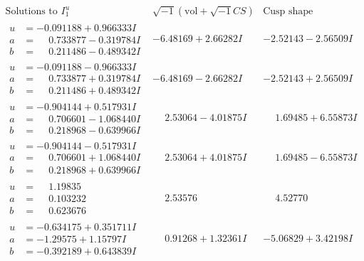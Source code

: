 \documentclass[1p]{elsarticle_modified}
\theoremstyle{definition}
\newcommand{\I}{\sqrt{-1}}
\begin{document}
$$\begin{array}{c|c|c}  
\text{Solutions to }I^u_{1}& \I (\text{vol} + \sqrt{-1}CS) & \text{Cusp shape}\\
 \hline 
\begin{aligned}
u &= -0.091188 + 0.966333 I \\
a &= \phantom{-}0.733877 - 0.319784 I \\
b &= \phantom{-}0.211486 - 0.489342 I\end{aligned}
 & -6.48169 + 2.66282 I & -2.52143 - 2.56509 I \\ \hline\begin{aligned}
u &= -0.091188 - 0.966333 I \\
a &= \phantom{-}0.733877 + 0.319784 I \\
b &= \phantom{-}0.211486 + 0.489342 I\end{aligned}
 & -6.48169 - 2.66282 I & -2.52143 + 2.56509 I \\ \hline\begin{aligned}
u &= -0.904144 + 0.517931 I \\
a &= \phantom{-}0.706601 - 1.068440 I \\
b &= \phantom{-}0.218968 - 0.639966 I\end{aligned}
 & \phantom{-}2.53064 - 4.01875 I & \phantom{-}1.69485 + 6.55873 I \\ \hline\begin{aligned}
u &= -0.904144 - 0.517931 I \\
a &= \phantom{-}0.706601 + 1.068440 I \\
b &= \phantom{-}0.218968 + 0.639966 I\end{aligned}
 & \phantom{-}2.53064 + 4.01875 I & \phantom{-}1.69485 - 6.55873 I \\ \hline\begin{aligned}
u &= \phantom{-}1.19835\phantom{ +0.000000I} \\
a &= \phantom{-}0.103232\phantom{ +0.000000I} \\
b &= \phantom{-}0.623676\phantom{ +0.000000I}\end{aligned}
 & \phantom{-}2.53576\phantom{ +0.000000I} & \phantom{-}4.52770\phantom{ +0.000000I} \\ \hline\begin{aligned}
u &= -0.634175 + 0.351711 I \\
a &= -1.29575 + 1.15797 I \\
b &= -0.392189 + 0.643839 I\end{aligned}
 & \phantom{-}0.91268 + 1.32361 I & -5.06829 + 3.42198 I \\ \hline\begin{aligned}

\end{aligned}
\end{array}$$
\end{document}
